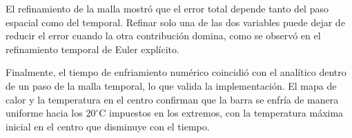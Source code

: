 \documentclass[12pt, letterpaper]{article}
\begin{document}
El refinamiento de la malla mostró que el error total depende tanto del paso espacial como del temporal. Refinar solo una de las dos variables puede dejar de reducir el error cuando la otra contribución domina, como se observó en el refinamiento temporal de Euler explícito.

Finalmente, el tiempo de enfriamiento numérico coincidió con el analítico dentro de un paso de la malla temporal, lo que valida la implementación. El mapa de calor y la temperatura en el centro confirman que la barra se enfría de manera uniforme hacia los \(20^\circ\)C impuestos en los extremos, con la temperatura máxima inicial en el centro que disminuye con el tiempo.

\end{document}
